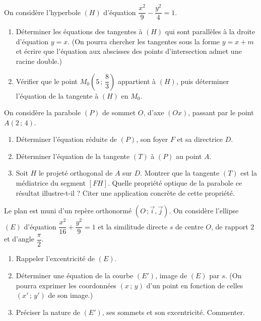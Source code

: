 \documentclass[11pt]{article}
\begin{document}
\begin{exercice}
On considère l'hyperbole $(H)$ d'équation $\dfrac{x^{2}}{9} - \dfrac{y^{2}}{4} = 1$.
\begin{enumerate}
\item Déterminer les équations des tangentes à $(H)$ qui sont parallèles à la droite d'équation $y = x$. (On pourra chercher les tangentes sous la forme $y = x + m$ et écrire que l'équation aux abscisses des points d'intersection admet une racine double.)
\item Vérifier que le point $M_{0}\left(5\,;\,\dfrac{8}{3}\right)$ appartient à $(H)$, puis déterminer l'équation de la tangente à $(H)$ en $M_{0}$.
\end{enumerate}
\end{exercice}

\begin{exercice}
On considère la parabole $(P)$ de sommet $O$, d'axe $(Ox)$, passant par le point $A(2\,;\,4)$.
\begin{enumerate}
\item Déterminer l'équation réduite de $(P)$, son foyer $F$ et sa directrice $D$.
\item Déterminer l'équation de la tangente $(T)$ à $(P)$ au point $A$.
\item Soit $H$ le projeté orthogonal de $A$ sur $D$. Montrer que la tangente $(T)$ est la médiatrice du segment $[FH]$. Quelle propriété optique de la parabole ce résultat illustre-t-il ? Citer une application concrète de cette propriété.
\end{enumerate}
\end{exercice}

\begin{exercice}
Le plan est muni d'un repère orthonormé $(O\,;\vec{i},\vec{j})$. On considère l'ellipse $(E)$ d'équation $\dfrac{x^{2}}{16} + \dfrac{y^{2}}{9} = 1$ et la similitude directe $s$ de centre $O$, de rapport $2$ et d'angle $\dfrac{\pi}{2}$.
\begin{enumerate}
\item Rappeler l'excentricité de $(E)$.
\item Déterminer une équation de la courbe $(E')$, image de $(E)$ par $s$. (On pourra exprimer les coordonnées $(x\,;\,y)$ d'un point en fonction de celles $(x'\,;\,y')$ de son image.)
\item Préciser la nature de $(E')$, ses sommets et son excentricité. Commenter.
\end{enumerate}
\end{exercice}
\end{document}
